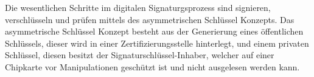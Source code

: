 Die wesentlichen Schritte im digitalen Signaturgsprozess sind signieren, verschlüsseln und prüfen mittels des asymmetrischen Schlüssel Konzepts. Das asymmetrische Schlüssel Konzept besteht aus der Generierung eines öffentlichen Schlüssels, dieser wird in einer Zertifizierungsstelle hinterlegt, und einem privaten Schlüssel, diesen besitzt der Signaturschlüssel-Inhaber, welcher auf einer Chipkarte vor Manipulationen geschützt ist und nicht ausgelesen werden kann. \cite{techno1} 